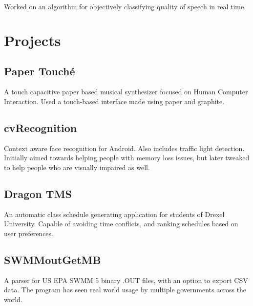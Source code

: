 \documentclass[]{deedy}
\begin{document}
\begin{minipage}[t]{0.66\textwidth}
Worked on an algorithm for objectively classifying quality of speech in real time.
\sectionsep


\section{Projects}
\subsection{Paper Touché}
A touch capacitive paper based musical synthesizer focused on
Human Computer Interaction. Used a touch-based interface made using
paper and graphite.
\sectionsep

\subsection{cvRecognition}
Context aware face recognition for Android. Also includes traffic light detection.
Initially aimed towards helping people with memory loss issues, but later tweaked
to help people who are visually impaired as well.
\sectionsep

\subsection{Dragon TMS}
An automatic class schedule generating application for students of Drexel University.
Capable of avoiding time conflicts, and ranking schedules based on user preferences.
\sectionsep

\subsection{SWMMoutGetMB}
A parser for US EPA SWMM 5 binary .OUT files, with an option to export CSV data.
The program has seen real world usage by multiple governments across the world.
\sectionsep

\end{minipage} 
\end{document}
